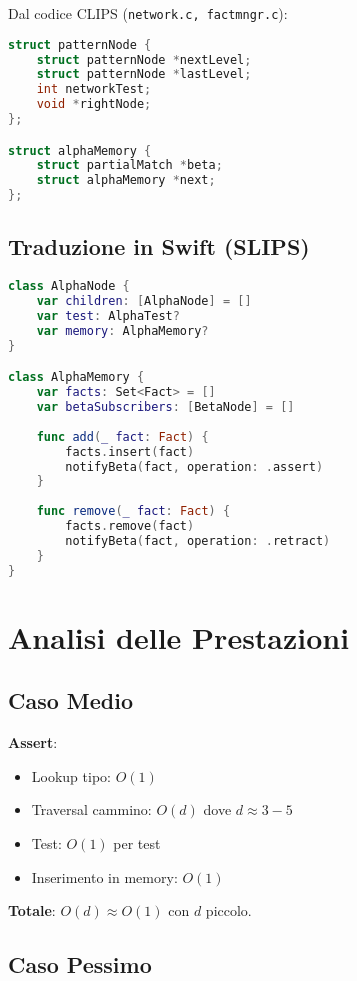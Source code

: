 Dal codice CLIPS (\texttt{network.c, factmngr.c}):

\begin{lstlisting}[language=C]
struct patternNode {
    struct patternNode *nextLevel;
    struct patternNode *lastLevel;
    int networkTest;
    void *rightNode;
};

struct alphaMemory {
    struct partialMatch *beta;
    struct alphaMemory *next;
};
\end{lstlisting}

\subsection{Traduzione in Swift (SLIPS)}

\begin{lstlisting}[language=Swift]
class AlphaNode {
    var children: [AlphaNode] = []
    var test: AlphaTest?
    var memory: AlphaMemory?
}

class AlphaMemory {
    var facts: Set<Fact> = []
    var betaSubscribers: [BetaNode] = []
    
    func add(_ fact: Fact) {
        facts.insert(fact)
        notifyBeta(fact, operation: .assert)
    }
    
    func remove(_ fact: Fact) {
        facts.remove(fact)
        notifyBeta(fact, operation: .retract)
    }
}
\end{lstlisting}

\section{Analisi delle Prestazioni}

\subsection{Caso Medio}

\textbf{Assert}:
\begin{itemize}
\item Lookup tipo: $O(1)$
\item Traversal cammino: $O(d)$ dove $d \approx 3-5$
\item Test: $O(1)$ per test
\item Inserimento in memory: $O(1)$
\end{itemize}

\textbf{Totale}: $O(d) \approx O(1)$ con $d$ piccolo.

\subsection{Caso Pessimo}

